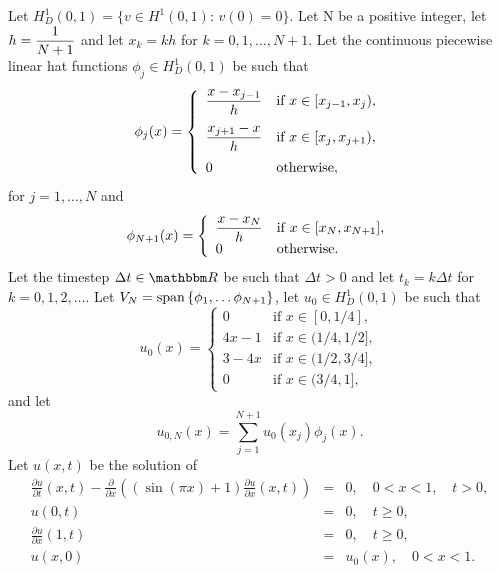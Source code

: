 Let $H^1_D\left(0,1\right)=\{v\in H^1\left(0,1\right):\,v(0)=0\}$. Let N be a positive integer, let $\displaystyle{h={1 \over N+1}}$ and let $x_k=kh$ for $k=0,1,\ldots,N+1$. Let the continuous piecewise linear hat functions $\phi_j\in H^1_D(0,1)$ be such that
\[
\phi_j(x) = \left\{\begin{array}{ll}
\displaystyle{{x-x_{j-1} \over h}} & \displaystyle{\mbox{if }x\in[x_{j-1},x_j)},
\\[10pt]
\displaystyle{{x_{j+1}-x \over h}} & \displaystyle{\mbox{if }x\in[x_j,x_{j+1})},
\\[10pt]
0 & \mbox{otherwise},
\end{array}\right.
\]
for $j=1,\ldots,N$ and
\[
\phi_{N+1}(x) = \left\{\begin{array}{ll}
\displaystyle{x-x_N \over h} & \mbox{if }x\in[x_N,x_{N+1}],\\
0& \mbox{otherwise.}
\end{array}\right.
\]
Let the timestep $\Delta t\in\R$ be such that $\Delta t>0$ and let $t_k=k\Delta t$ for $k=0,1,2,\ldots$. Let $V_N={\rm span}\left\{\phi_1,\ldots\phi_{N+1}\right\}$, let $u_0\in H^1_D(0,1)$ be such that
\[
u_0(x)=\left\{\begin{array}{ll}
0 & \mbox{if }x\in[0,1/4],\\
4x-1 & \mbox{if }x\in(1/4,1/2],\\
3-4x & \mbox{if }x\in(1/2,3/4],\\
0 & \mbox{if }x\in(3/4,1],
\end{array}\right.
\]
and let
\[
u_{0,N}(x)=\sum_{j=1}^{N+1}u_0(x_j)\phi_j(x).
\]
Let $u(x,t)$ be the solution of
\begin{eqnarray*}
\frac{\partial u}{\partial t}(x,t) - \frac{\partial}{\partial x}\left((\sin(\pi x)+1)\frac{\partial u}{\partial x}(x,t)\right)&=&0, \quad 0<x<1, \quad t>0,\\
u(0,t)&=&0, \quad t\ge0,\\
\frac{\partial u}{\partial x}(1,t)&=&0, \quad t\ge0,\\
u(x,0)&=&u_0(x), \quad 0<x<1.
\end{eqnarray*}

